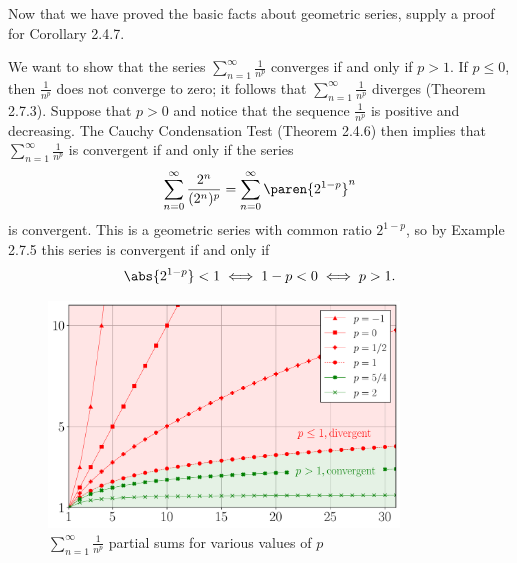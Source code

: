 \documentclass{lew98_solutions}
\begin{document}
\begin{exercise}
\label{ex:2.7.5}
    Now that we have proved the basic facts about geometric series, supply a proof for Corollary 2.4.7.
\end{exercise}

\begin{solution}
    We want to show that the series \( \sum_{n=1}^{\infty} \tfrac{1}{n^p} \) converges if and only if \( p > 1 \). If \( p \leq 0 \), then \( \tfrac{1}{n^p} \) does not converge to zero; it follows that \( \sum_{n=1}^{\infty} \tfrac{1}{n^p} \) diverges (Theorem 2.7.3). Suppose that \( p > 0 \) and notice that the sequence \( \tfrac{1}{n^p} \) is positive and decreasing. The Cauchy Condensation Test (Theorem 2.4.6) then implies that \( \sum_{n=1}^{\infty} \tfrac{1}{n^p} \) is convergent if and only if the series
    \[
        \sum_{n=0}^{\infty} \frac{2^n}{(2^n)^p} = \sum_{n=0}^{\infty} \paren{ 2^{1-p} }^n
    \]
    is convergent. This is a geometric series with common ratio \( 2^{1-p} \), so by Example 2.7.5 this series is convergent if and only if
    \[
        \abs{2^{1-p}} < 1 \iff 1 - p < 0 \iff p > 1.
    \]
    \begin{figure}[H]
        \centering
        \includegraphics[width=0.83\textwidth]{UA_Figures/UA_ex2_7_5_fig.pdf}
        \caption{\( \sum_{n=1}^{\infty} \tfrac{1}{n^p} \) partial sums for various values of \( p \)}
        \label{fig:ex2.7.5}
    \end{figure}
\end{solution}
\end{document}
